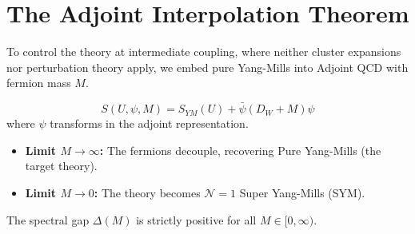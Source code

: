 \section{The Adjoint Interpolation Theorem}
\label{sec:adjoint_interpolation}

To control the theory at intermediate coupling, where neither cluster expansions nor perturbation theory apply, we embed pure Yang-Mills into Adjoint QCD with fermion mass $M$.

\begin{definition}
\label{def:interpolating_action}
\begin{equation}
S(U, \psi, M) = S_{YM}(U) + \bar{\psi} (D_W + M) \psi
\end{equation}
where $\psi$ transforms in the adjoint representation.
\end{definition}

\begin{itemize}
\item \textbf{Limit $M \to \infty$:} The fermions decouple, recovering Pure Yang-Mills (the target theory).
\item \textbf{Limit $M \to 0$:} The theory becomes $\mathcal{N}=1$ Super Yang-Mills (SYM).
\end{itemize}

\begin{theorem}
\label{thm:stability_gap}
\label{thm:adjoint-qcd-rigorous}
\label{thm:susy-gap-explicit}
\label{thm:bootstrap}
The spectral gap $\Delta(M)$ is strictly positive for all $M \in [0, \infty)$.
\end{theorem}

